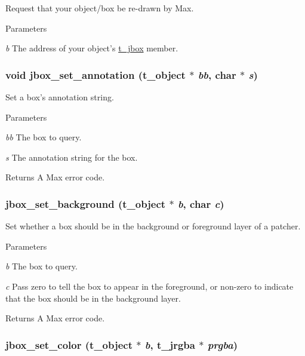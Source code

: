 Request that your object/box be re-\/drawn by Max. 
\begin{DoxyParams}{Parameters}
\item[{\em b}]The address of your object's \hyperlink{structt__jbox}{t\_\-jbox} member. \end{DoxyParams}
\hypertarget{group__jbox_ga2c9cde3892f9a68be579ea623c438dd0}{
\subsubsection[{jbox\_\-set\_\-annotation}]{\setlength{\rightskip}{0pt plus 5cm}void jbox\_\-set\_\-annotation ({\bf t\_\-object} $\ast$ {\em bb}, \/  char $\ast$ {\em s})}}
\label{group__jbox_ga2c9cde3892f9a68be579ea623c438dd0}


Set a box's annotation string. 
\begin{DoxyParams}{Parameters}
\item[{\em bb}]The box to query. \item[{\em s}]The annotation string for the box. \end{DoxyParams}
\begin{DoxyReturn}{Returns}
A Max error code. 
\end{DoxyReturn}
\hypertarget{group__jbox_gabcff56f0530497761daf30b021378308}{
\subsubsection[{jbox\_\-set\_\-background}]{ jbox\_\-set\_\-background ({\bf t\_\-object} $\ast$ {\em b}, \/  char {\em c})}}
\label{group__jbox_gabcff56f0530497761daf30b021378308}


Set whether a box should be in the background or foreground layer of a patcher. 
\begin{DoxyParams}{Parameters}
\item[{\em b}]The box to query. \item[{\em c}]Pass zero to tell the box to appear in the foreground, or non-\/zero to indicate that the box should be in the background layer. \end{DoxyParams}
\begin{DoxyReturn}{Returns}
A Max error code. 
\end{DoxyReturn}
\hypertarget{group__jbox_ga211b979a249719dadd1168d72bc6df37}{
\subsubsection[{jbox\_\-set\_\-color}]{ jbox\_\-set\_\-color ({\bf t\_\-object} $\ast$ {\em b}, \/  {\bf t\_\-jrgba} $\ast$ {\em prgba})}}
\label{group__jbox_ga211b979a249719dadd1168d72bc6df37}


